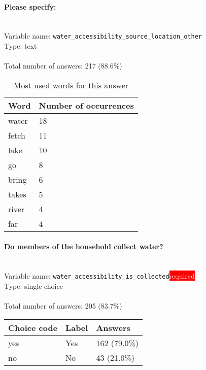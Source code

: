\documentclass[11.5pt, a4paper]{scrartcl}
\begin{document}
\paragraph{Please specify:}
\  \\Variable name: \texttt{water\_accessibility\_source\_location\_other}\\
Type: text\\
\\Total number of answers: 217 (88.6\%)
\\[0.2em]\begin{table}[H]
 \begin{tabular}{p{4cm}|p{8cm}}
Word & Number of occurrences  \\
\hline
\cellcolor{mygray}water&\cellcolor{mygray}18\\
\hline
fetch&11\\
\hline
\cellcolor{mygray}lake&\cellcolor{mygray}10\\
\hline
go&8\\
\hline
\cellcolor{mygray}bring&\cellcolor{mygray}6\\
\hline
takes&5\\
\hline
\cellcolor{mygray}river&\cellcolor{mygray}4\\
\hline
far&4\\
\hline
\end{tabular}
\caption{\label{tab:table-name} Most used words for this answer}
\end{table}
\paragraph{Do members of the household collect water?}
\  \\Variable name: \texttt{water\_accessibility\_is\_collected}\hfill\colorbox{red}{\small{\textcolor{white}{required}}}\\
 Type: single choice\\
\\Total number of answers: 205 (83.7\%)
\\[0.2em] \begin{tabular}{p{4cm}|p{8cm}|p{3cm}}
Choice code & Label & Answers \\
\hline
yes & Yes& \cellcolor{color3}162 (79.0\%)\\
\cellcolor{mygray} no & \cellcolor{mygray}No & \cellcolor{color1}43 (21.0\%)\\
\end{tabular}
\end{document}
